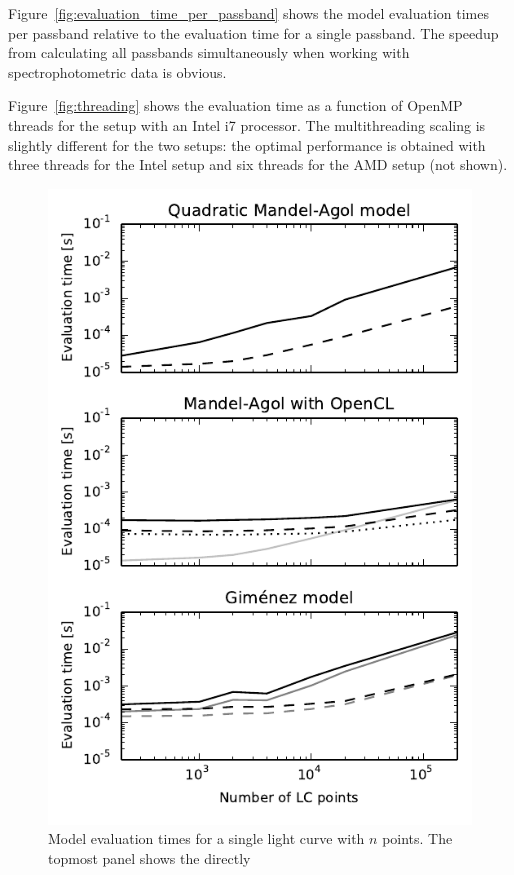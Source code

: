 \documentclass[usenatbib,usegraphicx,useAMS]{mn2e}
\begin{document}
{Figure~\ref{fig:evaluation_time_per_passband} shows the model evaluation times per passband relative to the evaluation 
time for a single passband. The speedup from calculating all passbands simultaneously when working with 
spectrophotometric data is obvious.

Figure~\ref{fig:threading} shows the evaluation time as a function of OpenMP threads for the setup with an Intel i7 
processor. The multithreading scaling is slightly different for the two setups: the optimal performance is obtained with 
three threads for the Intel setup and six threads for the AMD setup (not shown). 

\begin{figure}
 \centering
 \includegraphics[width=\columnwidth]{basic_scalability.pdf}
 \caption{Model evaluation times for a single light curve with $n$ points. The topmost panel shows the directly 
}
\end{figure}}
\end{document}
